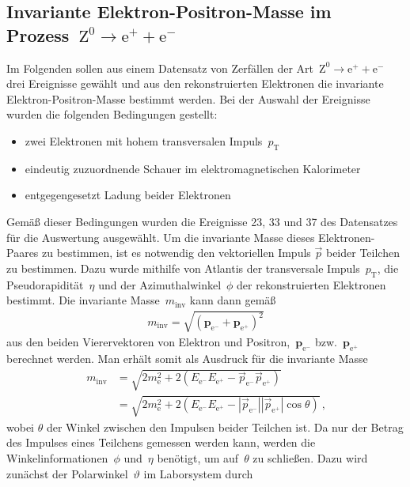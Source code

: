 \documentclass[11pt, a4paper]{article}
\numberwithin{equation}{section}
\begin{document}
\subsection{Invariante Elektron-Positron-Masse im Prozess~$\mathrm{Z}^0 \rightarrow \mathrm{e}^+ + \mathrm{e}^-$}
Im Folgenden sollen aus einem Datensatz von Zerfällen der Art~$\mathrm{Z}^0 \rightarrow \mathrm{e}^+ + \mathrm{e}^-$ drei Ereignisse gewählt und aus den rekonstruierten Elektronen die invariante Elektron-Positron-Masse bestimmt werden.
Bei der Auswahl der Ereignisse wurden die folgenden Bedingungen gestellt:
\begin{itemize}
	\item zwei Elektronen mit hohem transversalen Impuls~$p_\mathrm{T}$
	\item eindeutig zuzuordnende Schauer im elektromagnetischen Kalorimeter
	\item entgegengesetzt Ladung beider Elektronen
\end{itemize}
Gemäß dieser Bedingungen wurden die Ereignisse 23, 33 und 37 des Datensatzes für die Auswertung ausgewählt.
Um die invariante Masse dieses Elektronen-Paares zu bestimmen, ist es notwendig den vektoriellen Impuls $\vec{p}$ beider Teilchen zu bestimmen.
Dazu wurde mithilfe von Atlantis der transversale Impuls~$p_\mathrm{T}$, die Pseudorapidität~$\eta$ und der Azimuthalwinkel~$\phi$ der rekonstruierten Elektronen bestimmt.
Die invariante Masse~$m_\mathrm{inv}$ kann dann gemäß
\begin{align*}
	m_\mathrm{inv}=\sqrt{(\mathbf{p}_{\mathrm{e}^-}+\mathbf{p}_{\mathrm{e}^+})^2}
\end{align*}
aus den beiden Vierervektoren von Elektron und Positron,~$\mathbf{p}_{\mathrm{e}^-}$ bzw.~$\mathbf{p}_{\mathrm{e}^+}$ berechnet werden.
Man erhält somit als Ausdruck für die invariante Masse
\begin{align}
	m_\mathrm{inv}&=\sqrt{2 m^2_{\mathrm{e}} + 2 ( E_{\mathrm{e}^-} E_{\mathrm{e}^+} - \vec{p}_{\mathrm{e}^-}\vec{p}_{\mathrm{e}^+} )} \nonumber \\
	&=\sqrt{ 2m^2_{\mathrm{e}} + 2 (E_{\mathrm{e}^-} E_{\mathrm{e}^+} - |\vec{p}_{\mathrm{e}^-}||\vec{p}_{\mathrm{e}^+}|\cos\theta)}\,\text{,}
	\label{eq:inv_mass}
\end{align}
wobei $\theta$ der Winkel zwischen den Impulsen beider Teilchen ist.
Da nur der Betrag des Impulses eines Teilchens gemessen werden kann, werden die Winkelinformationen~$\phi$ und~$\eta$ benötigt, um auf~$\theta$ zu schließen.
Dazu wird zunächst der Polarwinkel~$\vartheta$ im Laborsystem durch
\end{document}

